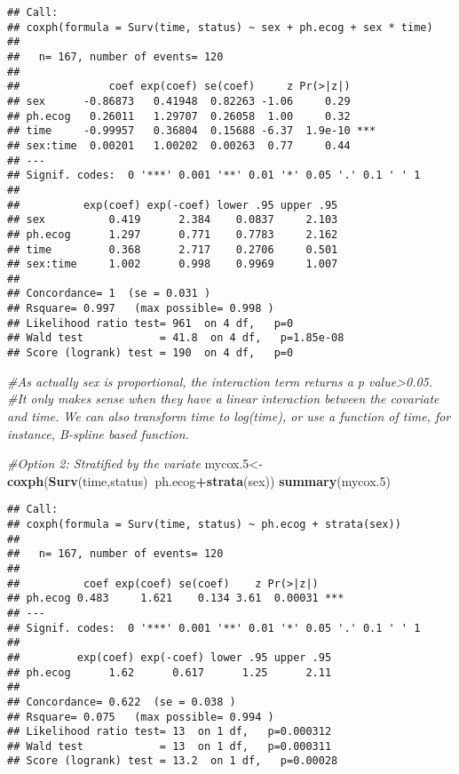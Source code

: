 \documentclass[]{book}
\newenvironment{Shaded}{\begin{snugshade}}{\end{snugshade}}
\newcommand{\KeywordTok}[1]{\textcolor[rgb]{0.13,0.29,0.53}{\textbf{#1}}}
\newcommand{\DecValTok}[1]{\textcolor[rgb]{0.00,0.00,0.81}{#1}}
\newcommand{\CommentTok}[1]{\textcolor[rgb]{0.56,0.35,0.01}{\textit{#1}}}
\newcommand{\OperatorTok}[1]{\textcolor[rgb]{0.81,0.36,0.00}{\textbf{#1}}}
\newcommand{\NormalTok}[1]{#1}
\theoremstyle{definition}
\theoremstyle{definition}
\theoremstyle{definition}
\theoremstyle{remark}
\begin{document}
\begin{verbatim}
## Call:
## coxph(formula = Surv(time, status) ~ sex + ph.ecog + sex * time)
## 
##   n= 167, number of events= 120 
## 
##              coef exp(coef) se(coef)     z Pr(>|z|)    
## sex      -0.86873   0.41948  0.82263 -1.06     0.29    
## ph.ecog   0.26011   1.29707  0.26058  1.00     0.32    
## time     -0.99957   0.36804  0.15688 -6.37  1.9e-10 ***
## sex:time  0.00201   1.00202  0.00263  0.77     0.44    
## ---
## Signif. codes:  0 '***' 0.001 '**' 0.01 '*' 0.05 '.' 0.1 ' ' 1
## 
##          exp(coef) exp(-coef) lower .95 upper .95
## sex          0.419      2.384    0.0837     2.103
## ph.ecog      1.297      0.771    0.7783     2.162
## time         0.368      2.717    0.2706     0.501
## sex:time     1.002      0.998    0.9969     1.007
## 
## Concordance= 1  (se = 0.031 )
## Rsquare= 0.997   (max possible= 0.998 )
## Likelihood ratio test= 961  on 4 df,   p=0
## Wald test            = 41.8  on 4 df,   p=1.85e-08
## Score (logrank) test = 190  on 4 df,   p=0
\end{verbatim}

\begin{Shaded}
\begin{Highlighting}[]
\CommentTok{#As actually sex is proportional, the interaction term returns a p value>0.05.}
\CommentTok{#It only makes sense when they have a linear interaction between the covariate and time. We can also transform time to log(time), or use a function of time, for instance, B-spline based function.}

\CommentTok{#Option 2: Stratified by the variate}
\NormalTok{mycox.}\DecValTok{5}\NormalTok{<-}\KeywordTok{coxph}\NormalTok{(}\KeywordTok{Surv}\NormalTok{(time,status)}\OperatorTok{~}\NormalTok{ph.ecog}\OperatorTok{+}\KeywordTok{strata}\NormalTok{(sex))}
\KeywordTok{summary}\NormalTok{(mycox.}\DecValTok{5}\NormalTok{)}
\end{Highlighting}
\end{Shaded}

\begin{verbatim}
## Call:
## coxph(formula = Surv(time, status) ~ ph.ecog + strata(sex))
## 
##   n= 167, number of events= 120 
## 
##          coef exp(coef) se(coef)    z Pr(>|z|)    
## ph.ecog 0.483     1.621    0.134 3.61  0.00031 ***
## ---
## Signif. codes:  0 '***' 0.001 '**' 0.01 '*' 0.05 '.' 0.1 ' ' 1
## 
##         exp(coef) exp(-coef) lower .95 upper .95
## ph.ecog      1.62      0.617      1.25      2.11
## 
## Concordance= 0.622  (se = 0.038 )
## Rsquare= 0.075   (max possible= 0.994 )
## Likelihood ratio test= 13  on 1 df,   p=0.000312
## Wald test            = 13  on 1 df,   p=0.000311
## Score (logrank) test = 13.2  on 1 df,   p=0.00028
\end{verbatim}
\end{document}

